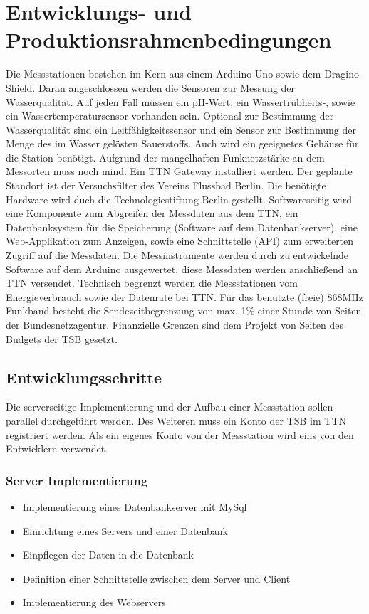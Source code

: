 \section{Entwicklungs- und Produktionsrahmenbedingungen}

Die Messstationen bestehen im Kern aus einem Arduino Uno sowie dem Dragino-Shield. Daran angeschlossen werden die Sensoren zur Messung der Wasserqualität. Auf jeden Fall müssen ein pH-Wert, ein Wassertrübheits-, sowie ein Wassertemperatursensor vorhanden sein. Optional zur Bestimmung der Wasserqualität sind ein Leitfähigkeitssensor und ein Sensor zur Bestimmung der Menge des im Wasser gelösten Sauerstoffs. Auch wird ein geeignetes Gehäuse für die Station benötigt.
Aufgrund der mangelhaften Funknetzstärke an dem Messorten muss noch mind. Ein TTN Gateway installiert werden. Der geplante Standort ist der Versuchsfilter des Vereins Flussbad Berlin. Die benötigte Hardware wird duch die Technologiestiftung Berlin gestellt.
Softwareseitig wird eine Komponente zum Abgreifen der Messdaten aus dem TTN, ein Datenbanksystem für die Speicherung (Software auf dem Datenbankserver), eine Web-Applikation zum Anzeigen, sowie eine Schnittstelle (API) zum erweiterten Zugriff auf die Messdaten. Die Messinstrumente werden durch zu entwickelnde Software auf dem Arduino ausgewertet, diese Messdaten werden anschließend an TTN versendet.
Technisch begrenzt werden die Messstationen vom Energieverbrauch sowie der Datenrate bei TTN. Für das benutzte (freie) 868MHz Funkband besteht die Sendezeitbegrenzung von max. 1\% einer Stunde von Seiten der Bundesnetzagentur.
Finanzielle Grenzen sind dem Projekt von Seiten des Budgets der TSB gesetzt.

\subsection{Entwicklungsschritte}


Die serverseitige Implementierung und der Aufbau einer Messstation sollen parallel durchgeführt werden. Des Weiteren muss ein Konto der TSB im TTN registriert werden. Als ein eigenes Konto von der Messstation wird eins von den Entwicklern verwendet.

\subsubsection{Server Implementierung}
\begin{itemize}
	\item Implementierung eines Datenbankserver mit MySql
	\item Einrichtung eines Servers und einer Datenbank
	\item Einpflegen der Daten in die Datenbank
	\item Definition einer Schnittstelle zwischen dem Server und Client
	\item Implementierung des Webservers
\end{itemize}

